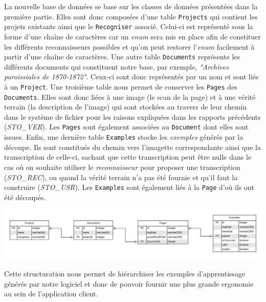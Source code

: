 La nouvelle base de données se base sur les classes de données présentées dans la première partie. Elles sont donc composées d'une table \texttt{Projects} qui contient les projets existants ainsi que le \texttt{Recogniser} associé. Celui-ci est représenté sous la forme d'une chaîne de caractères car un \textit{enum} sera mis en place afin de constituer les différents reconnaisseurs possibles et qu'on peut restorer l'\textit{enum} facilement à partir d'une chaîne de caractères. Une autre table \texttt{Documents} représente les différents documents qui constituent notre base, par exemple, \textit{"Archives paroissiales de 1870-1872"}. Ceux-ci sont donc représentés par un nom et sont liés à un \texttt{Project}. Une troisième table nous permet de conserver les \texttt{Pages} des \texttt{Documents}. Elles sont donc liées à une image (le scan de la page) et à une vérité terrain (la description de l'image) qui sont stockées au travers de leur chemin dans le système de fichier pour les raisons expliquées dans les rapports précédents (\textit{STO\_VER}). Les \texttt{Pages} sont également associées au \texttt{Document} dont elles sont issues. Enfin, une dernière table \texttt{Examples} stocke les \textit{exemples} générés par la découpe. Ils sont constitués du chemin vers l'imagette correspondante ainsi que la transcription de celle-ci, sachant que cette transcription peut être nulle dans le cas où on souhaite utiliser le \textit{reconnaisseur} pour proposer une transcription (\textit{STO\_REC}), ou quand la vérité terrain n'a pas été fournie et qu'il faut la construire (\textit{STO\_USR}). Les \texttt{Examples} sont également liés à la \texttt{Page} d'où ils ont été découpés.

\begin{mdframed}[frametitle={Figure 8 : Structure de la base de données}, innerbottommargin=10]
\begin{center}
\includegraphics[scale=0.53]{assets/DatabaseEntity.pdf}
\end{center}
\end{mdframed}

\newpage{}
Cette structuration nous permet de hiérarchiser les exemples d'apprentissage générés par notre logiciel et donc de pouvoir fournir une plus grande ergonomie au sein de l'application client.

